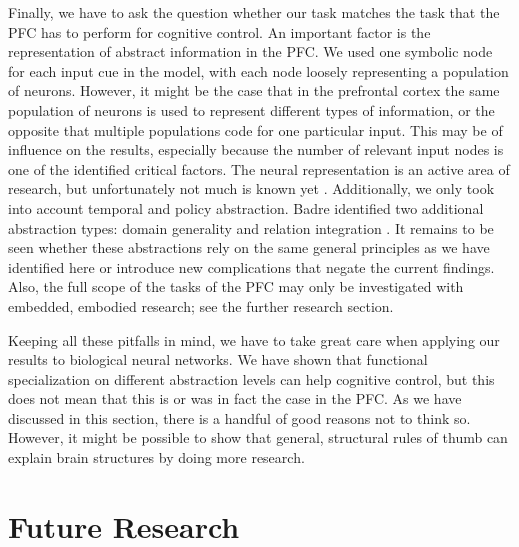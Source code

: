 \documentclass[10pt,a4paper]{report}
\begin{document}
Finally, we have to ask the question whether our task matches the task that the PFC has to perform for cognitive control. An important factor is the representation of abstract information in the PFC. We used one symbolic node for each input cue in the model, with each node loosely representing a population of neurons. However, it might be the case that in the prefrontal cortex the same population of neurons is used to represent different types of information, or the opposite that multiple populations code for one particular input. This may be of influence on the results, especially because the number of relevant input nodes is one of the identified critical factors. The neural representation is an active area of research, but unfortunately not much is known yet \citep{Jin2009,Tiesinga2008}. Additionally, we only took into account temporal and policy abstraction. Badre identified two additional abstraction types: domain generality and relation integration \citep{Badre2009}. It remains to be seen whether these abstractions rely on the same general principles as we have identified here or introduce new complications that negate the current findings. Also, the full scope of the tasks of the PFC may only be investigated with embedded, embodied research; see the further research section. 

Keeping all these pitfalls in mind, we have to take great care when applying our results to biological neural networks. We have shown that functional specialization on different abstraction levels can help cognitive control, but this does not mean that this is or was in fact the case in the PFC. As we have discussed in this section, there is a handful of good reasons not to think so. However, it might be possible to show that general, structural rules of thumb can explain brain structures by doing more research.

\section{Future Research}
\end{document}
